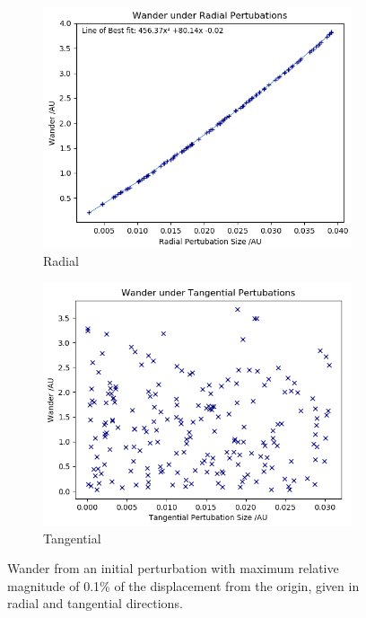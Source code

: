 \documentclass[11pt, a4paper,twocolumn]{article} %
\begin{document}
\begin{figure}[hb!]
	\centering
	\begin{subfigure}{.45\textwidth}
		\centering
		\includegraphics[width=\linewidth]{Figures/wanderagainstradialpertubation2}  
		\caption{Radial}
		\label{fig:wander_rad}
	\end{subfigure}
	\hfill %
	\begin{subfigure}{.45\textwidth}
		\centering
		\includegraphics[width=\linewidth]{Figures/wanderagainsttangentialpertubation2}  
		\caption{Tangential}
		\label{fig:wander_tan}
	\end{subfigure}
	\caption{Wander from an initial perturbation with maximum relative magnitude of 0.1\% of the displacement from the origin, given in radial and tangential directions.}
	\label{fig:wanderplots}
\end{figure}
\end{document}
